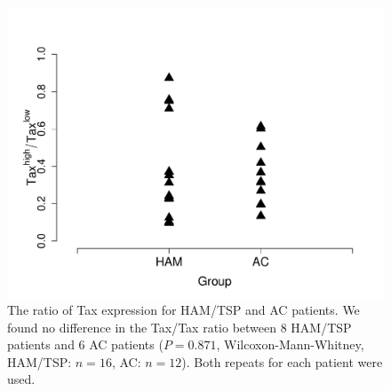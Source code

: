 \begin{figure}[htp]
\centering
\includegraphics[width=14cm]{./Figures/chapter5/Ratios}
\caption[The ratio of Tax expression for HAM/TSP and AC patients]{The ratio of Tax expression for HAM/TSP and AC patients. We found no difference in the Tax/Tax ratio between 8 HAM/TSP patients and 6 AC patients ($P = 0.871$, Wilcoxon-Mann-Whitney, HAM/TSP: $n=16$, AC: $n=12$). Both repeats for each patient were used.}
\label{chapter5/figureRatio}
\end{figure}